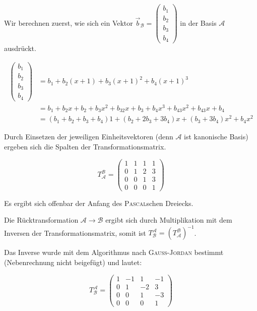\documentclass[a4paper,german,12pt,smallheadings]{scrartcl}
\begin{document}
Wir berechnen zuerst, wie sich ein Vektor $\vec{b}_{\mathcal{B}}  = \begin{pmatrix} b_1 \\ b_2
\\ b_3 \\ b_4 \end{pmatrix}$ in der Basis $\mathcal{A}$ ausdrückt.

\begin{align*}
  \begin{pmatrix} b_1 \\ b_2\\ b_3 \\ b_4 \end{pmatrix} &= b_1 + b_2(x+1) + b_3(x+1)^2 + b_4(x+1)^3 \\
                                                        &= b_1 + b_2x + b_2 + b_3x^2 + b_32x + b_3 + b_4x^3 + b_43x^2 + b_43x + b_4 \\
                                                        &= (b_1 + b_2 + b_3 + b_4)1 + (b_2 + 2b_3 + 3b_4)x + (b_3 + 3b_4)x^2 + b_4x^2
\end{align*}

Durch Einsetzen der jeweiligen Einheitsvektoren (denn $\mathcal{A}$ ist
kanonische Basis) ergeben sich die Spalten der Transformationsmatrix.

\begin{equation}
  T_{\mathcal{A}}^{\mathcal{B}} = \begin{pmatrix} 1 & 1 & 1 & 1 \\ 0 & 1 & 2 & 3 \\ 0 & 0 & 1 & 3 \\ 0 & 0 & 0 & 1\end{pmatrix}
\end{equation}

Es ergibt sich offenbar der Anfang des \textsc{Pascal}schen Dreiecks.

Die Rücktransformation $\mathcal{A} \to \mathcal{B}$ ergibt sich durch
Multiplikation mit dem Inversen der Transformationsmatrix, somit ist
$T_{\mathcal{B}}^{\mathcal{A}} =
\left(T_{\mathcal{A}}^{\mathcal{B}}\right)^{-1}$.

Das Inverse wurde mit dem Algorithmus nach \textsc{Gauß-Jordan} bestimmt
(Nebenrechnung nicht beigefügt) und lautet:

\begin{equation}
  T_{\mathcal{B}}^{\mathcal{A}} = \begin{pmatrix} 1 & -1 & 1 & -1 \\ 0 & 1 & -2 & 3 \\ 0 & 0 & 1 & -3 \\ 0 & 0 & 0 & 1\end{pmatrix}
\end{equation}
\end{document}
